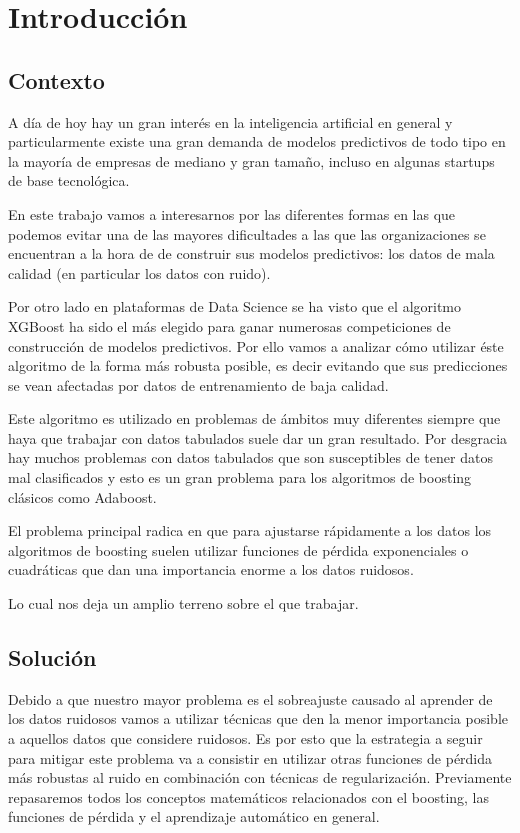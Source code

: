 \chapter{Introducción}

\section{Contexto}

A día de hoy hay un gran interés en la inteligencia artificial en general y particularmente existe una gran demanda de modelos predictivos de todo tipo en la mayoría de empresas de mediano y gran tamaño, incluso en algunas startups de base tecnológica.  

En este trabajo vamos a interesarnos por las diferentes formas en las que podemos evitar una de las mayores dificultades a las que las organizaciones se encuentran a la hora de de construir sus modelos predictivos: los datos de mala calidad (en particular los datos con ruido).

Por otro lado en plataformas de Data Science se ha visto que el algoritmo XGBoost ha sido el más elegido para ganar numerosas competiciones de construcción de modelos predictivos. Por ello vamos a analizar cómo utilizar éste algoritmo de la forma más robusta posible, es decir evitando que sus predicciones se vean afectadas por datos de entrenamiento de baja calidad.

Este algoritmo es utilizado en problemas de ámbitos muy diferentes siempre que haya que trabajar con datos tabulados suele dar un gran resultado.  
Por desgracia hay muchos problemas con datos tabulados que son susceptibles de tener datos mal clasificados y esto es un gran problema para los algoritmos de boosting clásicos como Adaboost.  

El problema principal radica en que para ajustarse rápidamente a los datos los algoritmos de boosting suelen utilizar funciones de pérdida exponenciales o cuadráticas que dan una importancia enorme a los datos ruidosos. 

Lo cual nos deja un amplio terreno sobre el que trabajar.

\section{Solución}
Debido a que nuestro mayor problema es el sobreajuste causado al aprender de los datos ruidosos vamos a utilizar técnicas que den la menor importancia posible a aquellos datos que considere ruidosos.  
Es por esto que la estrategia a seguir para mitigar este problema va a consistir en utilizar otras funciones de pérdida más robustas al ruido en combinación con técnicas de regularización.  
Previamente repasaremos todos los conceptos matemáticos relacionados con el boosting, las funciones de pérdida y el aprendizaje automático en general. 

